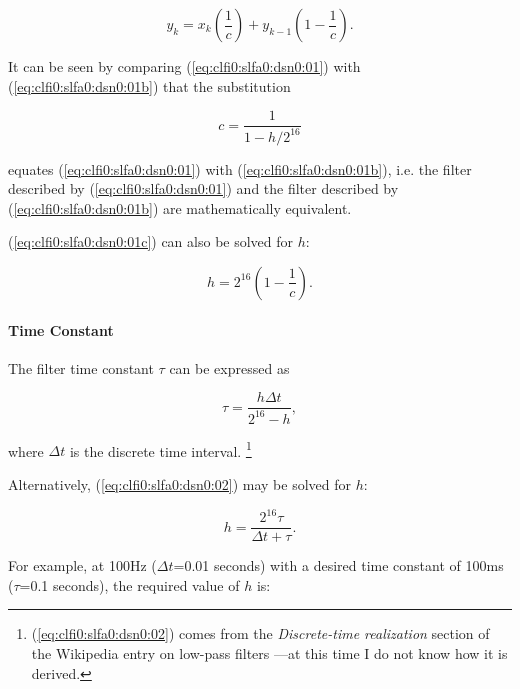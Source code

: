 \begin{equation}
\label{eq:clfi0:slfa0:dsn0:01b}
y_{k} = 
x_k \left( \frac{1}{c} \right)
+ y_{k-1} \left( {1-\frac{1}{c}} \right).
\end{equation}

\noindent{}It can be seen by comparing 
(\ref{eq:clfi0:slfa0:dsn0:01}) with 
(\ref{eq:clfi0:slfa0:dsn0:01b}) that the substitution 

\begin{equation}
\label{eq:clfi0:slfa0:dsn0:01c}
c = \frac{1}{1-h/2^{16}}
\end{equation}

\noindent{}equates (\ref{eq:clfi0:slfa0:dsn0:01}) with 
(\ref{eq:clfi0:slfa0:dsn0:01b}), i.e. the filter described  by 
(\ref{eq:clfi0:slfa0:dsn0:01}) and the filter 
described by (\ref{eq:clfi0:slfa0:dsn0:01b}) are 
mathematically equivalent.

(\ref{eq:clfi0:slfa0:dsn0:01c}) can also be solved for $h$:

\begin{equation}
\label{eq:clfi0:slfa0:dsn0:01d}
h = 2^{16}\left( 1 - \frac{1}{c} \right).
\end{equation}


\paragraph{Time Constant}

The filter time constant $\tau$ can be expressed as

\begin{equation}
\label{eq:clfi0:slfa0:dsn0:02}
\tau = \frac{h \Delta t}{2^{16} - h} ,
\end{equation}

\noindent{}where $\Delta t$ is the discrete time interval.%
\footnote{(\ref{eq:clfi0:slfa0:dsn0:02}) comes from the
\emph{Discrete-time realization} section of the Wikipedia 
entry on low-pass filters \cite{bibref:w:wikipedialowpassfilter}---at this
time I do not
know how it is derived.}

Alternatively, (\ref{eq:clfi0:slfa0:dsn0:02}) may be solved for $h$:

\begin{equation}
\label{eq:clfi0:slfa0:dsn0:03}
h = \frac{2^{16} \tau}{\Delta t + \tau} .
\end{equation}

For example, at 100Hz ($\Delta t$=0.01 seconds) with a desired time constant
of 100ms ($\tau$=0.1 seconds), the required value of $h$ is:

